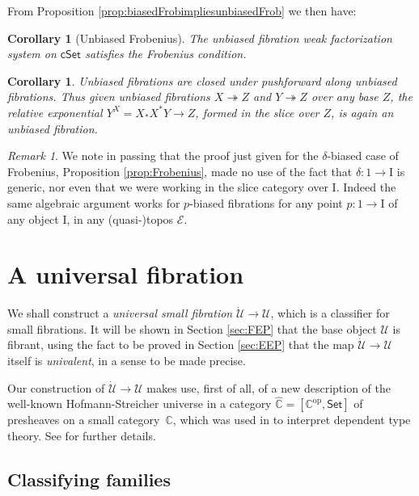 \documentclass[11pt,reqno]{amsart}
\newcommand{\bbC}{\ensuremath{\mathbb{C}}}
\newcommand{\EE}{\ensuremath{\mathcal{E}}}
\newcommand{\Set}{\ensuremath{\mathsf{Set}}}
\newcommand{\cSet}{\ensuremath{\mathsf{cSet}}}
\newcommand{\op}[1]{\ensuremath{{#1}^{\mathrm{op}}}}
\newcommand{\ra}{\ensuremath{\rightarrow}}
\newcommand{\fib}{\ensuremath{\twoheadrightarrow}}
\renewcommand{\to}{\ensuremath{\rightarrow}}
\newcommand{\I}{\ensuremath{\mathrm{I}}}
\newcommand{\U}{\ensuremath{\mathcal{U}}}
\newtheorem{corollary}[theorem]{Corollary}
\theoremstyle{remark}
\newtheorem{remark}[theorem]{Remark}
\theoremstyle{definition}
\begin{document}
From Proposition \ref{prop:biasedFrobimpliesunbiasedFrob} we then have:

\begin{corollary}[Unbiased Frobenius]\label{cor:unbiasedFrobenius}
The unbiased fibration weak factorization system on $\cSet$ satisfies the Frobenius condition.
\end{corollary}

\begin{corollary}\label{cor:unbiasedPi}
Unbiased fibrations are closed under pushforward along unbiased fibrations.  Thus given unbiased fibrations $X\fib Z$ and $Y\fib Z$ over any base $Z$, the relative exponential $Y^X = X_*X^* Y \to Z$, formed in the slice over $Z$, is again an unbiased fibration.
\end{corollary}

\begin{remark}\label{remark:unbiasedFrobeniusgeneralizes}
We note in passing that the proof just given for the $\delta$-biased case of Frobenius, Proposition \ref{prop:Frobenius}, made no use of the fact that $\delta : 1\to\I$ is generic, nor even that we were working in the slice category over $\I$.  Indeed the same algebraic argument works for $p$-biased fibrations for any point $p : 1\to\I$ of any object $\I$, in any (quasi-)topos $\EE$.
\end{remark}

\section{A universal fibration}\label{sec:U}

We shall construct a \emph{universal small fibration} $\dot{\U}\ra \U$, which is a classifier for small fibrations.  It will be shown in Section \ref{sec:FEP} that the base object $\U$ is fibrant, using the fact to be proved in Section \ref{sec:EEP} that the map $\dot{\U}\ra \U$ itself is \emph{univalent}, in a sense to be made precise.

Our construction of $\dot{\U}\ra \U$ makes use, first of all, of a new description of the well-known Hofmann-Streicher universe in a category $\widehat{\bbC} = [\op{\bbC}, \Set]$ of presheaves on a small category~$\bbC$, which was used in \cite{HS:1997} to interpret dependent type theory. See \cite{awodey:HSuniverse} for further details. 

\subsection*{Classifying families}\label{sec:Ufam}
\end{document}
